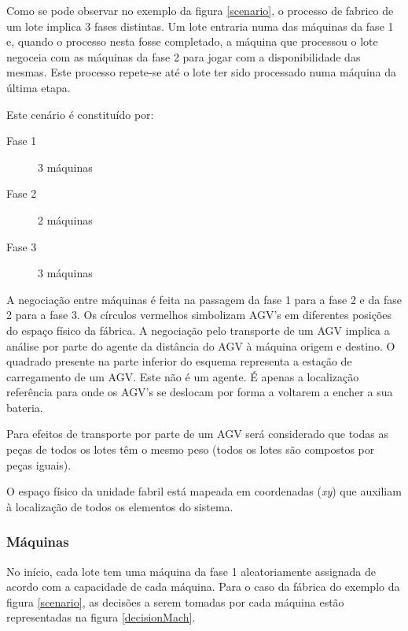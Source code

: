\begin{titlepage}
Como se pode observar no exemplo da figura \ref{scenario}, o processo de fabrico de um lote implica 3 fases distintas. Um lote entraria numa das máquinas da fase 1 e, quando o processo nesta fosse completado, a máquina que processou o lote negoceia com as máquinas da fase 2 para jogar com a disponibilidade das mesmas. Este processo repete-se até o lote ter sido processado numa máquina da última etapa. 

\newpage
Este cenário é constituído por:

\begin{description}
\item[Fase 1] 3 máquinas
\item[Fase 2] 2 máquinas 
\item[Fase 3] 3 máquinas
\end{description}

A negociação entre máquinas é feita na passagem da fase 1 para a fase 2 e da fase 2 para a fase 3. Os círculos vermelhos simbolizam AGV's em diferentes posições do espaço físico da fábrica. A negociação pelo transporte de um AGV implica a análise por parte do agente da distância do AGV à máquina origem e destino. O quadrado presente na parte inferior do esquema representa a estação de carregamento de um AGV. Este não é um agente. É apenas a localização referência para onde os AGV's se deslocam por forma a voltarem a encher a sua bateria.

Para efeitos de transporte por parte de um AGV será considerado que todas as peças de todos os lotes têm o mesmo peso (todos os lotes são compostos por peças iguais).

O espaço físico da unidade fabril está mapeada em coordenadas (\textit{xy}) que auxiliam à localização de todos os elementos do sistema.

\subsubsection{Máquinas}

No início, cada lote tem uma máquina da fase 1 aleatoriamente assignada de acordo com a capacidade de cada máquina. Para o caso da fábrica do exemplo da figura \ref{scenario}, as decisões a serem tomadas por cada máquina estão representadas na figura \ref{decisionMach}.\newline\newline


\end{titlepage}
